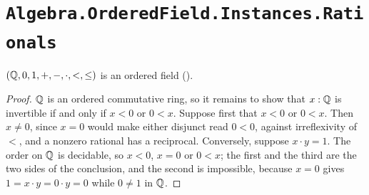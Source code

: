 \section{\texttt{Algebra.OrderedField.Instances.Rationals}}

\begin{theorem}
  \label{QOrderedField}
  $(\mathbb{Q}, 0, 1, +, -, \cdot, <, \le)$ is an ordered field ().
\end{theorem}
\begin{proof}
  $\mathbb{Q}$ is an ordered commutative ring, so it remains to show that $x : \mathbb{Q}$ is invertible if and only if $x < 0$ or $0 < x$. Suppose first that $x < 0$ or $0 < x$. Then $x \ne 0$, since $x = 0$ would make either disjunct read $0 < 0$, against irreflexivity of $<$, and a nonzero rational has a reciprocal. Conversely, suppose $x \cdot y = 1$. The order on $\mathbb{Q}$ is decidable, so $x < 0$, $x = 0$ or $0 < x$; the first and the third are the two sides of the conclusion, and the second is impossible, because $x = 0$ gives $1 = x \cdot y = 0 \cdot y = 0$ while $0 \ne 1$ in $\mathbb{Q}$.
\end{proof}
